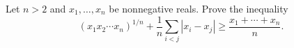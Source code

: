 Let $n > 2$ and $x_1, \ldots, x_n$ be nonnegative reals. Prove the inequality
\[ (x_1x_2 \cdots x_n)^{1/n} + \frac{1}{n}\sum_{i<j} |x_i - x_j| \geq \frac{x_1 + \cdots + x_n}{n}. \]
